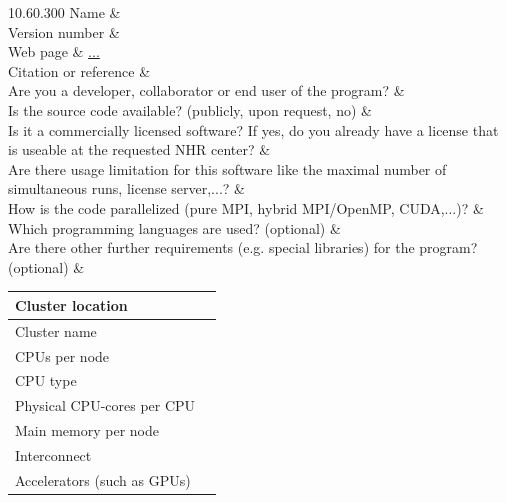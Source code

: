 \documentclass[new,showhints]{nhrproposal}
\begin{document}
\Titlepage

\Introduction

\PreliminaryWork

\ProjectDescription
{}

\ComputeResources
\CodeOverview
\begin{Codetable}{1}{0.6\linewidth}{0.3\linewidth}{0}{0} %
 Name           &  \\ \hline
 Version number &  \\ \hline
 Web page       & \url{...}   \\ \hline
 Citation or reference &   \\ \hline 
 Are you a developer, collaborator or end user of the program? &   \\ \hline
 Is the source code available? (publicly, upon request, no) &   \\ \hline
 Is it a commercially licensed software? If yes, do you already have a license that is useable at the requested NHR center?  &  \\ \hline
 Are there usage limitation for this software like the maximal number of simultaneous runs, license server,...?  &  \\ \hline
 How is the code parallelized (pure MPI, hybrid MPI/OpenMP, CUDA,...)? &  \\ \hline
 Which programming languages are used? (optional) &  \\ \hline
 Are there other further requirements (e.g. special libraries) for the program? (optional) &   \\ \hline
\end{Codetable}

\CodeBenchmarks
{}
\BenchmarkDescription

\BenchmarkSystem
\begin{center}
\begin{tabular}{|G{5cm}|L{10cm}|}\hline
Cluster location &  \\ \hline
Cluster name & \\ \hline
CPUs per node & \\ \hline
CPU type & \\ \hline
Physical CPU-cores per CPU & \\ \hline
Main memory per node & \\ \hline
Interconnect & \\ \hline
Accelerators (such as GPUs) & \\ \hline
\end{tabular}
\end{center}
\end{document}

